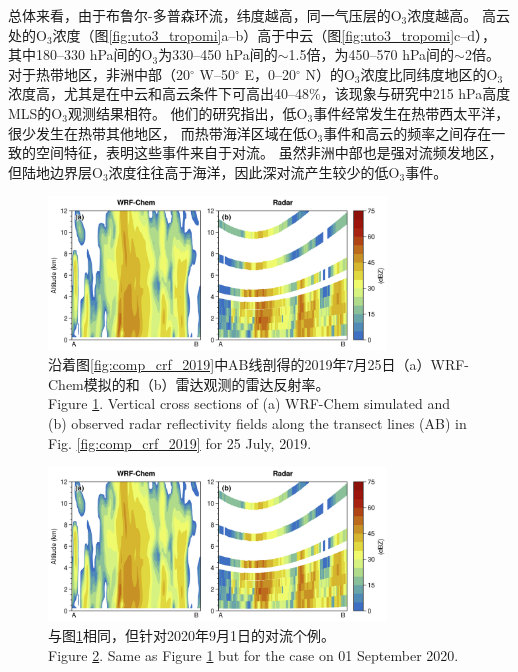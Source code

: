 总体来看，由于布鲁尔-多普森环流，纬度越高，同一气压层的O$_3$浓度越高。
高云处的O$_3$浓度（图\ref{fig:uto3_tropomi}a--b）高于中云（图\ref{fig:uto3_tropomi}c--d），
其中180--330 hPa间的O$_3$为330--450 hPa间的$\sim$1.5倍，为450--570 hPa间的$\sim$2倍。
对于热带地区，非洲中部（20$^{\circ}$ W--50$^{\circ}$ E，0--20$^{\circ}$ N）的O$_3$浓度比同纬度地区的O$_3$浓度高，尤其是在中云和高云条件下可高出40--48\%，该现象与\citet{Cooper.2013}研究中215 hPa高度MLS的O$_3$观测结果相符。
他们的研究指出，低O$_3$事件经常发生在热带西太平洋，很少发生在热带其他地区，
而热带海洋区域在低O$_3$事件和高云的频率之间存在一致的空间特征，表明这些事件来自于对流。
虽然非洲中部也是强对流频发地区，但陆地边界层O$_3$浓度往往高于海洋，因此深对流产生较少的低O$_3$事件。

\begin{figure}[H]
\centering
\includegraphics[width=0.8\textwidth]{./figures/comp_dbzcross_2019.png}
\caption{沿着图\ref{fig:comp_crf_2019}中AB线剖得的2019年7月25日（a）WRF-Chem模拟的和（b）雷达观测的雷达反射率。\\
Figure \ref{fig:comp_dbzcross_2019}. Vertical cross sections of (a) WRF-Chem simulated and (b) observed radar reflectivity fields along the transect lines (AB) in Fig. \ref{fig:comp_crf_2019} for 25 July, 2019.}
\label{fig:comp_dbzcross_2019}
\end{figure}

\begin{figure}[H]
\centering
\includegraphics[width=0.8\textwidth]{./figures/comp_dbzcross_2019.png}
\caption{与图\ref{fig:comp_dbzcross_2019}相同，但针对2020年9月1日的对流个例。\\
Figure \ref{fig:comp_dbzcross_2020}. Same as Figure \ref{fig:comp_dbzcross_2019} but for the case on 01 September 2020.}
\label{fig:comp_dbzcross_2020}
\end{figure}

